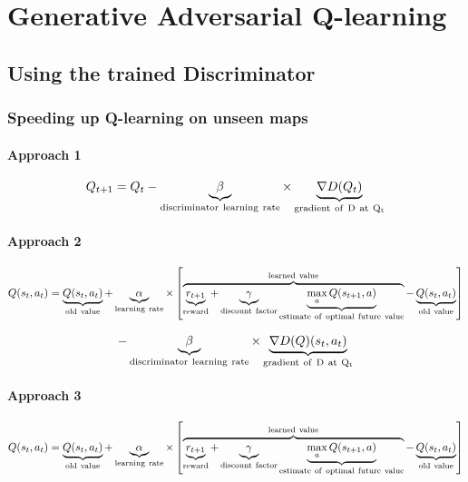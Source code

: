 
\chapter{Generative Adversarial Q-learning} %

\label{Chapter6}

\section{Using the trained Discriminator}
\subsection{Speeding up Q-learning on unseen maps}

\subsubsection{Approach 1}
\[Q_{t+1} = Q_{t}-\underbrace{\beta}_{\rm discriminator~learning~rate} \times \underbrace{\nabla D(Q_{t})}_{\rm gradient~of~D~at~Q_{t}}\]

\subsubsection{Approach 2}
  \[Q(s_{t},a_{t}) = \underbrace{Q(s_t,a_t)}_{\rm old~value} +
  \underbrace{\alpha}_{\rm learning~rate} \times \left[
    \overbrace{\underbrace{r_{t+1}}_{\rm reward} + \underbrace{\gamma}_{\rm
        discount~factor} \underbrace{\max_{a}Q(s_{t+1}, a)}_{\rm
        estimate~of~optimal~future~value}}^{\rm learned~value} -
    \underbrace{Q(s_t,a_t)}_{\rm old~value} \right]\]
    
    \[- \underbrace{\beta}_{\rm discriminator~learning~rate} \times \underbrace{\nabla D(Q)(s_{t}, a_{t})}_{\rm gradient~of~D~at~Q_{t}} \]

\subsubsection{Approach 3}

  \[Q(s_{t},a_{t}) = \underbrace{Q(s_t,a_t)}_{\rm old~value} +
  \underbrace{\alpha}_{\rm learning~rate} \times \left[
    \overbrace{\underbrace{r_{t+1}}_{\rm reward} + \underbrace{\gamma}_{\rm
        discount~factor} \underbrace{\max_{a}Q(s_{t+1}, a)}_{\rm
        estimate~of~optimal~future~value}}^{\rm learned~value} -
    \underbrace{Q(s_t,a_t)}_{\rm old~value} \right]\]
    
